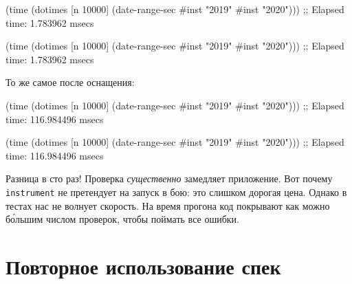 
\ifx\devicetype\mobile

\begin{english}
  \begin{clojure}
(time
 (dotimes [n 10000]
   (date-range-sec #inst "2019"
                   #inst "2020")))
;; Elapsed time: 1.783962 msecs
  \end{clojure}
\end{english}

\else

\begin{english}
  \begin{clojure}
(time
 (dotimes [n 10000]
   (date-range-sec #inst "2019" #inst "2020")))
;; Elapsed time: 1.783962 msecs
  \end{clojure}
\end{english}

\fi

\noindent
То же самое после оснащения:

\ifx\devicetype\mobile

\begin{english}
  \begin{clojure}
(time
 (dotimes [n 10000]
   (date-range-sec #inst "2019"
                   #inst "2020")))
;; Elapsed time: 116.984496 msecs
  \end{clojure}
\end{english}

\else

\begin{english}
  \begin{clojure}
(time
 (dotimes [n 10000]
   (date-range-sec #inst "2019" #inst "2020")))
;; Elapsed time: 116.984496 msecs
  \end{clojure}
\end{english}

\fi


Разница в сто раз! Проверка \emph{существенно} замедляет приложение. Вот почему
\verb|instrument| не претендует на запуск в бою: это слишком дорогая
цена. Однако в тестах нас не волнует скорость. На время прогона код покрывают
как можно б\'{о}льшим числом проверок, чтобы поймать все ошибки.

\section{Повторное использование спек}


